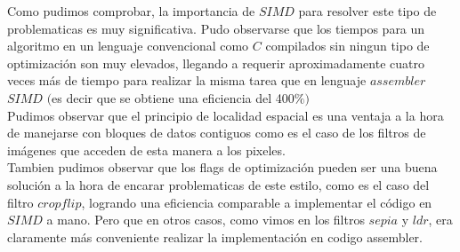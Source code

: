 Como pudimos comprobar, la importancia de $SIMD$ para resolver este tipo de problematicas es muy significativa. 
Pudo observarse que los tiempos para un algoritmo en un lenguaje convencional como $C$ compilados sin ningun tipo de optimización son muy elevados, llegando a requerir aproximadamente cuatro veces más de tiempo para realizar la misma tarea que en lenguaje $assembler$ $SIMD$ $($es decir que se obtiene una eficiencia del 400$ \% )$\\

Pudimos observar que el principio de localidad espacial es una ventaja a la hora de manejarse con bloques de datos contiguos como es el caso de los filtros de imágenes que acceden de esta manera a los pixeles.\\

Tambien pudimos observar que los flags de optimización pueden ser una buena solución a la hora de encarar problematicas de este estilo, como es el caso del filtro $cropflip$, logrando una eficiencia comparable a implementar el código en $SIMD$ a mano. Pero que en otros casos, como vimos en los filtros $sepia$ y $ldr$, era claramente más conveniente realizar la implementación en codigo assembler.
